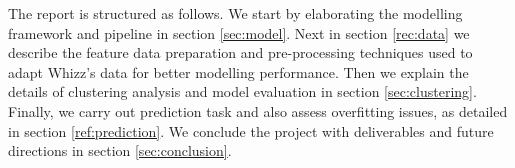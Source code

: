 The report is structured as follows. We start by elaborating the modelling framework and pipeline in section \ref{sec:model}. Next in section \ref{rec:data} we describe the feature data preparation and pre-processing techniques used to adapt Whizz's data for better modelling performance. Then we explain the details of clustering analysis and model evaluation in section \ref{sec:clustering}. Finally, we carry out prediction task and also assess overfitting issues, as detailed in section \ref{ref:prediction}. We conclude the project with deliverables and future directions in section \ref{sec:conclusion}.
